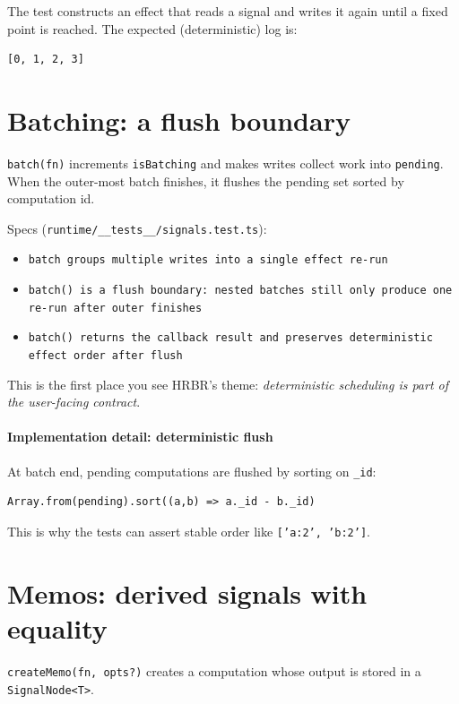 The test constructs an effect that reads a signal and writes it again until a fixed point is reached.
The expected (deterministic) log is:

\begin{verbatim}
[0, 1, 2, 3]
\end{verbatim}

\section{Batching: a flush boundary}

\texttt{batch(fn)} increments \texttt{isBatching} and makes writes collect work into \texttt{pending}.
When the outer-most batch finishes, it flushes the pending set sorted by computation id.

Specs (\texttt{runtime/\_\_tests\_\_/signals.test.ts}):

\begin{itemize}
  \item \texttt{batch groups multiple writes into a single effect re-run}
  \item \texttt{batch() is a flush boundary: nested batches still only produce one re-run after outer finishes}
  \item \texttt{batch() returns the callback result and preserves deterministic effect order after flush}
\end{itemize}

This is the first place you see HRBR's theme: \emph{deterministic scheduling is part of the user-facing contract}.

\paragraph{Implementation detail: deterministic flush}

At batch end, pending computations are flushed by sorting on \texttt{\_id}:

\begin{verbatim}
Array.from(pending).sort((a,b) => a._id - b._id)
\end{verbatim}

This is why the tests can assert stable order like \texttt{['a:2', 'b:2']}.

\section{Memos: derived signals with equality}

\texttt{createMemo(fn, opts?)} creates a computation whose output is stored in a \texttt{SignalNode<T>}.

